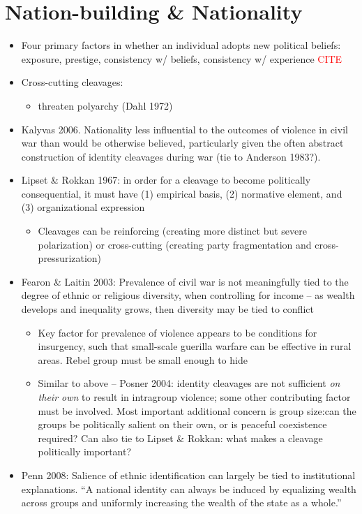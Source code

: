 \documentclass[12pt]{article}
\begin{document}
\section*{Nation-building \& Nationality}


\begin{itemize}
    \item Four primary factors in whether an individual adopts new political beliefs: exposure, prestige, consistency w/ beliefs, consistency w/ experience \textcolor{red}{CITE}
    \item Cross-cutting cleavages:
    \begin{itemize}
        \item threaten polyarchy (Dahl 1972)
    \end{itemize}
    \item Kalyvas 2006. Nationality less influential to the outcomes of violence in civil war than would be otherwise believed, particularly given the often abstract construction of identity cleavages during war (tie to Anderson 1983?). 
    \item Lipset \& Rokkan 1967: in order for a cleavage to become politically consequential, it must have (1) empirical basis, (2) normative element, and (3) organizational expression
    \begin{itemize}
        \item Cleavages can be reinforcing (creating more distinct but severe polarization) or cross-cutting (creating party fragmentation and cross-pressurization)
    \end{itemize}
    \item Fearon \& Laitin 2003: Prevalence of civil war is not meaningfully tied to the degree of ethnic or religious diversity, when controlling for income -- as wealth develops and inequality grows, then diversity may be tied to conflict
    \begin{itemize}
        \item Key factor for prevalence of violence appears to be conditions for insurgency, such that small-scale guerilla warfare can be effective in rural areas. Rebel group must be small enough to hide
        \item Similar to above -- Posner 2004: identity cleavages are not sufficient \emph{on their own} to result in intragroup violence; some other contributing factor must be involved. Most important additional concern is group size:can the groups be politically salient on their own, or is peaceful coexistence required? Can also tie to Lipset \& Rokkan: what makes a cleavage politically important?
    \end{itemize}
    \item Penn 2008: Salience of ethnic identification can largely be tied to institutional explanations. ``A national identity can always be induced by equalizing wealth across groups and uniformly increasing the wealth of the state as a whole.''
\end{itemize}
\end{document}

